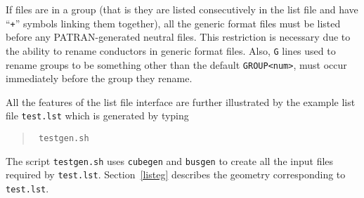 If
files are in a group (that is they are listed consecutively in the list file
and have ``{\tt +}'' symbols linking them together), all the generic
format files must be listed before any PATRAN-generated neutral files. 
This restriction
is necessary due to the ability to rename conductors in generic format files.
Also, {\tt G} lines used to rename groups to be something other than
the default {\tt GROUP<num>}, must occur immediately before the group they
rename.

All the features of the list file interface are further illustrated
by the example list file {\tt test.lst} which is generated by
typing 
\begin{quote}\tt
testgen.sh
\end{quote}
The script {\tt testgen.sh} uses {\tt cubegen} and {\tt busgen} to
create all the input files required by {\tt test.lst}.
Section~\ref{listeg} describes the geometry
corresponding to {\tt test.lst}.
